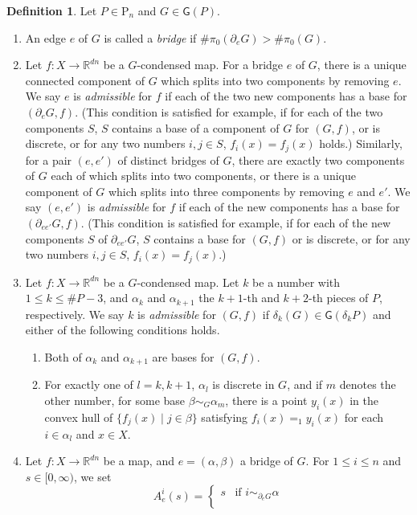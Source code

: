 \documentclass[reqno]{amsart}
\theoremstyle{definition}
\newtheorem{defi}{Definition}[section]
\theoremstyle{plain}
\newcommand{\GG}{\mathsf{G}}%
\newcommand{\RR}{\mathbb{R}}
\newcommand{\PP}{\mathrm{P}} %
\begin{document}
\begin{defi}\label{Dcondensed2}
Let $P\in \PP_n$ and $G\in\GG(P)$.
\begin{enumerate}
\item An edge $e$ of  $G$ is called a {\em bridge} if $\#\pi_0(\partial_eG)>\#\pi_0(G)$.
\item Let $f:X\to \RR^{dn}$ be a $G$-condensed map. For a bridge $e$ of $G$, there is a unique connected component of $G$ which splits into two components by removing $e$.  We say   $e$  is {\em admissible} for $f$ if each of the two  new components has a base  for $(\partial_eG, f)$. (This condition is satisfied for example,  if for each  of the two components $S$, $S$  contains a base of a component of $G$ for $(G,f)$, or is discrete, or for any two numbers  $i,j \in S$,  $f_i(x)=f_j(x)$ holds.)  Similarly, for  a pair $(e,e')$ of distinct bridges of $G$, there are exactly two components of $G$ each of which splits into two components, or there is a unique component of $G$ which splits into three components by removing $e$ and $e'$.   
We say  $(e,e')$  is {\em admissible} for $f$ if each of
the new components has a base for $(\partial_{ee'}G, f)$. 
(This condition is satisfied for example, if for each of the new components $S$ of $\partial_{ee'}G$, $S$ contains a base for $(G,f)$ or is discrete, or  for any two numbers  $i,j \in S$,  $f_i(x)=f_j(x)$.) 
\item Let  $f:X\to \RR^{dn}$ be a $G$-condensed map. Let $k$ be a  number  with $1\leq k\leq \# P-3$, and $\alpha_k$ and  $\alpha_{k+1}$ the $k+1$-th and $k+2$-th pieces of $P$, respectively. We say $k$  is {\em admissible} for $(G,f)$ if $\delta_k(G)\in \GG(\delta_kP)$ and either of the following conditions holds.
\begin{enumerate}
\item Both of $\alpha_k$ and $\alpha_{k+1}$ are bases for $(G,f)$.
\item  For exactly one  of $l=k,k+1$,  $\alpha_{l}$ is  discrete in $G$, and if  $m$ denotes the other number, for some base $\beta\sim_G\alpha_{m}$,  there is a point $y_i(x)$ in the convex hull of $\{f_j(x)\mid j\in \beta\}$ satisfying $f_i(x)=_1y_i(x)$ for each $i\in\alpha_{l}$ and $x\in X$. 
\end{enumerate}
\item Let $f:X\to \RR^{dn}$ be a  map, and $e=(\alpha,\beta)$  a bridge of  $G$. For $1\leq i\leq n$ and $s\in [0,\infty)$, we set 
\[
A_{e}^i(s)=\left\{\begin{array}{cl}
s & \text{if $i\sim _{\partial_eG} \alpha$} \\

\end{array}\]
\end{enumerate}
\end{defi}
\end{document}
